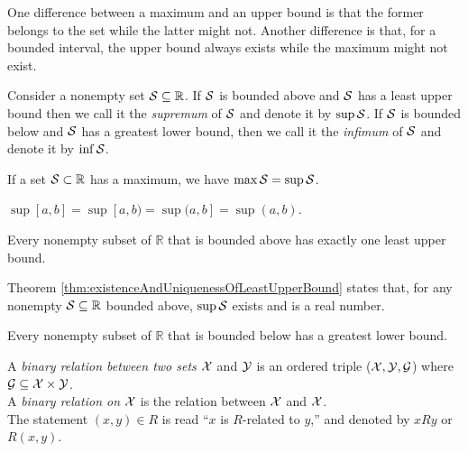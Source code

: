 \begin{rem}
One difference between a maximum and an upper bound
 is that the former belongs to the set
 while the latter might not.
Another difference is that,
 for a bounded interval,
 the upper bound always exists
 while the maximum might not exist.
\end{rem}

\begin{defn}
  \label{def:SupAndInf}
  Consider a nonempty set \mbox{${\cal S}\subseteq \mathbb{R}$}.
  If ${\cal S}$ is bounded above and ${\cal S}$
   has a least upper bound 
   then we call it the \emph{supremum}
   of ${\cal S}$
   and denote it by $\sup {\cal S}$.
  If ${\cal S}$ is bounded below and ${\cal S}$
   has a greatest lower bound,
   then we call it the \emph{infimum}
   of ${\cal S}$
   and denote it by $\inf {\cal S}$.
\end{defn}

\begin{exm}
  If a set ${\cal S}\subset \mathbb{R}$ has a maximum,
   we have \mbox{$\max{\cal S}=\sup {\cal S}$}.
\end{exm}

\begin{exm}
  $\sup[a,b]=\sup[a,b)=\sup(a,b]=\sup(a,b)$.
\end{exm}

\begin{thm}
  \label{thm:existenceAndUniquenessOfLeastUpperBound}
  Every nonempty subset of $\mathbb{R}$ %
   that is bounded above has exactly one least upper bound.
\end{thm}

\begin{rem}
  Theorem \ref{thm:existenceAndUniquenessOfLeastUpperBound} states that, 
  for any nonempty ${\cal S}\subseteq \mathbb{R}$ bounded above,
  $\sup {\cal S}$ exists and is a real number.
\end{rem}

\begin{coro}
  \label{coro:existenceAndUniquenessOfGreatestLowerBound}
  Every nonempty subset of $\mathbb{R}$ %
  that is bounded below has a greatest lower bound.
\end{coro}

\begin{defn}
  A \emph{binary relation between two sets} ${\cal X}$ and ${\cal Y}$
  is an ordered triple
  (${\cal X}, {\cal Y}, {\cal G}$)
  where ${\cal G}\subseteq{\cal X}\times{\cal Y}$.\\
  A \emph{binary relation on} ${\cal X}$
  is the relation between ${\cal X}$ and ${\cal X}$.\\
  The statement $(x,y)\in R$ is read
  ``$x$ is $R$-related to $y$,'' and
  denoted by $xRy$ or $R(x,y)$.
\end{defn}

